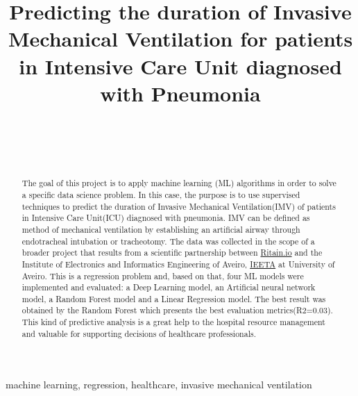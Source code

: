 \documentclass[journal]{IEEEtran} %
\begin{document}
\title{Predicting the duration of Invasive Mechanical Ventilation for patients in Intensive Care Unit diagnosed with Pneumonia\\}

\author{%
    \\%
    \\%
    \\%
}

\maketitle

\begin{abstract}
The goal of this project is to apply machine learning (ML) algorithms in order to solve a specific data science problem. In this case, the purpose is to use supervised techniques to predict the duration of Invasive Mechanical Ventilation(IMV) of patients in Intensive Care Unit(ICU) diagnosed with pneumonia. IMV can be defined as method of mechanical ventilation by establishing an artificial airway through endotracheal intubation or tracheotomy. The data was collected in the scope of a broader project that results from a scientific partnership between \hyperlink{https://ritain.io}{Ritain.io} and the Institute of Electronics and Informatics Engineering of Aveiro, \hyperlink{http://www.ieeta.pt/}{IEETA} at University of Aveiro. This is a regression problem and, based on that, four ML models were implemented and evaluated: a Deep Learning model, an Artificial neural network model, a Random Forest model and a Linear Regression model. The best result was obtained by the Random Forest which presents the best evaluation metrics(R2=0.03). This kind of predictive analysis is a great help to the hospital resource management and valuable for supporting decisions of healthcare professionals.
\end{abstract}

\begin{IEEEkeywords}
    machine learning, regression, healthcare, invasive mechanical ventilation
\end{IEEEkeywords}
\end{document}
